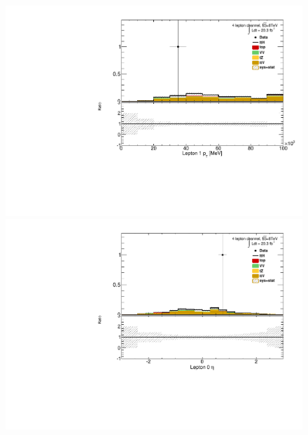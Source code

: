 \begin{figure}[!htbp]
\begin{minipage}[h]{0.5\textwidth}
  \end{minipage}\hfill
  \begin{minipage}[h]{0.5\textwidth}
    \centering \includegraphics[width=\textwidth]{figs/results/plotCand_4lep_Lep1Pt}
  \end{minipage}\hfill
  \begin{minipage}[h]{0.5\textwidth}
    \centering \includegraphics[width=\textwidth]{figs/results/plotCand_4lep_Lep0Eta}
  \end{minipage}\hfill
  \begin{minipage}[h]{0.5\textwidth}

\end{minipage}
\end{figure}
